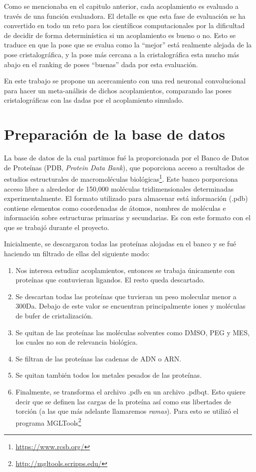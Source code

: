 Como se mencionaba en el capitulo anterior, cada acoplamiento es
evaluado a través de una función evaluadora. El detalle es que esta
fase de evaluación se ha convertido en todo un reto para los
científicos computacionales por la dificultad de decidir de forma
determinística si un acoplamiento es bueno o no. Esto se traduce en
que la pose que se evalua como la ``mejor'' está realmente alejada de
la pose cristalográfica, y la pose más cercana a la cristalográfica
esta mucho más abajo en el ranking de poses ``buenas'' dada por esta
evaluación.

En este trabajo se propone un acercamiento con una red neuronal
convolucional para hacer un meta-análisis de dichos acoplamientos,
comparando las poses cristalográficas con las dadas por el acoplamiento
simulado.

\section{Preparación de la base de datos}
La base de datos de la cual partimos fué la proporcionada por el Banco
de Datos de Proteínas (PDB, \textit{Protein Data Bank}), que
poporciona acceso a resultados de estudios estructurales de
macromoléculas biológicas\footnote{\url{https://www.rcsb.org/}}. Este
banco porporciona acceso libre a alrededor de 150,000 moléculas
tridimensionales determinadas experimentalmente. El formato utilizado
para almacenar está información (.pdb) contiene elementos como coordenadas de
átomos, nombres de moléculas e información sobre estructuras primarias
y secundarias. Es con este formato con el que se trabajó durante el
proyecto.

Inicialmente, se descargaron todas las proteínas alojadas en el banco
y se fué haciendo un filtrado de ellas del siguiente modo:
\begin{enumerate}
  \item Nos interesa estudiar acoplamientos, entonces se trabaja únicamente
  con proteínas que contuvieran ligandos. El resto queda descartado.
  \item Se descartan todas las proteínas que tuvieran un peso
    molecular menor a 300Da. Debajo de este valor se encuentran
    principalmente iones y moléculas de bufer de cristalización.
  \item Se quitan de las proteínas las moléculas solventes
  como DMSO, PEG y MES, los cuales no son de relevancia biológica.\@
  \item Se filtran de las proteínas las cadenas de ADN o ARN.\@
  \item Se quitan también todos los metales pesados de las proteínas.
  \item Finalmente, se transforma el archivo .pdb en un archivo .pdbqt.
  Esto quiere decir que se definen las cargas de la proteína así como
  sus libertades de torción (a las que más adelante
  llamaremos \textit{ramas}). Para esto se utilizó el programa
  MGLTools\footnote{\url{http://mgltools.scripps.edu/}}
\end{enumerate}


